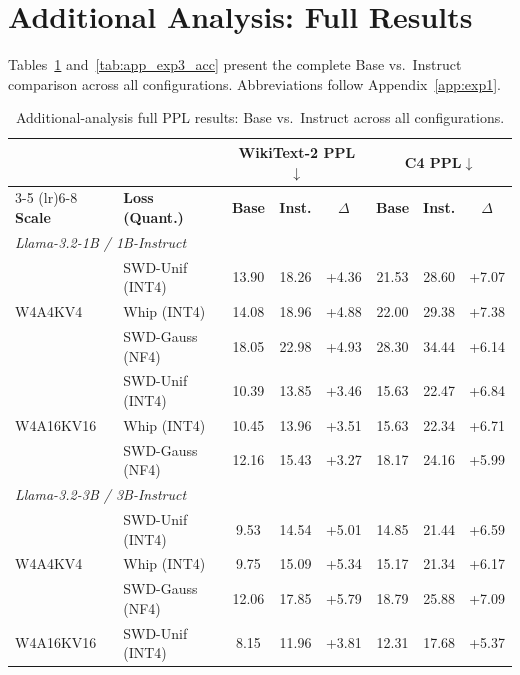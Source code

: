 \documentclass[11pt,a4paper]{article}
\begin{document}
 
\section{Additional Analysis: Full Results}
\label{app:exp3}

Tables~\ref{tab:app_exp3_ppl} and~\ref{tab:app_exp3_acc} present the complete Base vs.\ Instruct comparison across all configurations. Abbreviations follow Appendix~\ref{app:exp1}.
 
\begin{table}[!ht]
\centering
\caption{Additional-analysis full PPL results: Base vs.\ Instruct across all configurations.}
\label{tab:app_exp3_ppl}
\vspace{0.3em}
\footnotesize
\setlength{\tabcolsep}{4pt}
\begin{tabular}{ll cc c cc c}
\toprule
& & \multicolumn{3}{c}{\textbf{WikiText-2 PPL}$\downarrow$} & \multicolumn{3}{c}{\textbf{C4 PPL}$\downarrow$} \\
\cmidrule(lr){3-5} \cmidrule(lr){6-8}
\textbf{Scale} & \textbf{Loss (Quant.)} & \textbf{Base} & \textbf{Inst.} & $\Delta$ & \textbf{Base} & \textbf{Inst.} & $\Delta$ \\
\midrule
\multicolumn{8}{l}{\emph{Llama-3.2-1B / 1B-Instruct}} \\
\midrule
\multirow{3}{*}{W4A4KV4}
  & SWD-Unif (INT4)  & 13.90 & 18.26 & +4.36 & 21.53 & 28.60 & +7.07 \\
  & Whip (INT4)       & 14.08 & 18.96 & +4.88 & 22.00 & 29.38 & +7.38 \\
  & SWD-Gauss (NF4)   & 18.05 & 22.98 & +4.93 & 28.30 & 34.44 & +6.14 \\
\midrule
\multirow{3}{*}{W4A16KV16}
  & SWD-Unif (INT4)  & 10.39 & 13.85 & +3.46 & 15.63 & 22.47 & +6.84 \\
  & Whip (INT4)       & 10.45 & 13.96 & +3.51 & 15.63 & 22.34 & +6.71 \\
  & SWD-Gauss (NF4)   & 12.16 & 15.43 & +3.27 & 18.17 & 24.16 & +5.99 \\
\midrule
\multicolumn{8}{l}{\emph{Llama-3.2-3B / 3B-Instruct}} \\
\midrule
\multirow{3}{*}{W4A4KV4}
  & SWD-Unif (INT4)  & 9.53 & 14.54 & +5.01 & 14.85 & 21.44 & +6.59 \\
  & Whip (INT4)       & 9.75 & 15.09 & +5.34 & 15.17 & 21.34 & +6.17 \\
  & SWD-Gauss (NF4)   & 12.06 & 17.85 & +5.79 & 18.79 & 25.88 & +7.09 \\
\midrule
\multirow{3}{*}{W4A16KV16}
  & SWD-Unif (INT4)  & 8.15 & 11.96 & +3.81 & 12.31 & 17.68 & +5.37 \\

\end{tabular}
\end{table}
\end{document}
